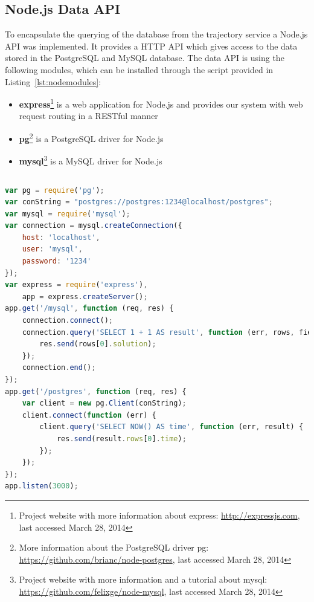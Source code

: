 \documentclass[master,english]{hgbthesis}
\begin{document}
\subsection{Node.js Data API}
To encapsulate the querying of the database from the trajectory service a Node.js API was implemented. It provides a HTTP API which gives access to the data stored in the PostgreSQL and MySQL database. The data API is using the following modules, which can be installed through the script provided in Listing~\ref{lst:nodemodules}:
\begin{itemize}
\item \textbf{express}\footnote{Project website with more information about express: \url{http://expressjs.com}, last accessed March 28, 2014} is a web application for Node.js and provides our system with web request routing in a RESTful manner
\item \textbf{pg}\footnote{More information about the PostgreSQL driver pg: \url{https://github.com/brianc/node-postgres}, last accessed March 28, 2014} is a PostgreSQL driver for Node.js
\item \textbf{mysql}\footnote{Project website with more information and a tutorial about mysql: \url{https://github.com/felixge/node-mysql}, last accessed March 28, 2014} is a MySQL driver for Node.js
\end{itemize}
\begin{lstlisting}[style=BashInputStyle,caption={Script to install the used Node.js modules},label={lst:nodemodules}]
\end{lstlisting}
\begin{lstlisting}[style=htmlcssjs,language=JavaScript,caption={Example for a Node.js app which is using the express framework and the PostgreSQL and MySQL module},label={lst:nodeexpress}]
var pg = require('pg');
var conString = "postgres://postgres:1234@localhost/postgres";
var mysql = require('mysql');
var connection = mysql.createConnection({
    host: 'localhost',
    user: 'mysql',
    password: '1234'
});
var express = require('express'),
    app = express.createServer();
app.get('/mysql', function (req, res) {
    connection.connect();
    connection.query('SELECT 1 + 1 AS result', function (err, rows, fields) {
        res.send(rows[0].solution);
    });
    connection.end();
});
app.get('/postgres', function (req, res) {
    var client = new pg.Client(conString);
    client.connect(function (err) {
        client.query('SELECT NOW() AS time', function (err, result) {
            res.send(result.rows[0].time);
        });
    });
});
app.listen(3000);
\end{lstlisting} 
\end{document}
